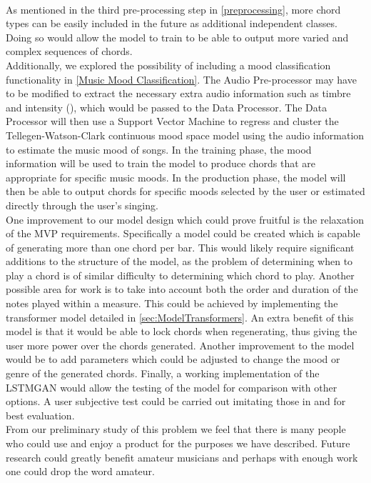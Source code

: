 \\
As mentioned in the third pre-processing step in \cref{preprocessing}, more chord types can be easily included in the future as additional independent classes. 
Doing so would allow the model to train to be able to output more varied and complex sequences of chords.
\\
Additionally, we explored the possibility of including a mood classification functionality in \cref{Music Mood Classification}. 
The Audio Pre-processor may have to be modified to extract the necessary extra audio information such as timbre and intensity (\cite{Timbre}), which would be passed to the Data Processor. 
The Data Processor will then use a Support Vector Machine to regress and cluster the Tellegen-Watson-Clark continuous mood space model using the audio information to estimate the music mood of songs. 
In the training phase, the mood information will be used to train the model to produce chords that are appropriate for specific music moods. 
In the production phase, the model will then be able to output chords for specific moods selected by the user or estimated directly through the user's singing.
\\
One improvement to our model design which could prove fruitful is the relaxation of the MVP requirements. 
Specifically a model could be created which is capable of generating more than one chord per bar.
This would likely require significant additions to the structure of the model, as the problem of determining when to play a chord is of similar difficulty to determining which chord to play.
Another possible area for work is to take into account both the order and duration of the notes played within a measure.
This could be achieved by implementing the transformer model detailed in \cref{sec:ModelTransformers}.
An extra benefit of this model is that it would be able to lock chords when regenerating, thus giving the user more power over the chords generated.
Another improvement to the model would be to add parameters which could be adjusted to change the mood or genre of the generated chords.
Finally, a working implementation of the LSTMGAN would allow the testing of the model for comparison with other options.
A user subjective test could be carried out imitating those in  and  for best evaluation.
\\
From our preliminary study of this problem we feel that there is many people who could use and enjoy a product for the purposes we have described. 
Future research could greatly benefit amateur musicians and perhaps with enough work one could drop the word amateur.
